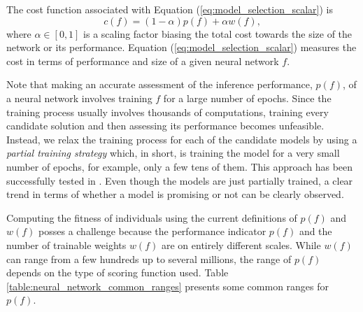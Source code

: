 \documentclass[12pt]{elsart}%
\begin{document}
The cost function associated with Equation (\ref{eq:model_selection_scalar}) is
\begin{equation}
c(f) = (1-\alpha)p(f) + \alpha w(f), 
\label{eq:fitness_function_scalar}
\end{equation}
where $\alpha \in \left[0,1\right]$ is a scaling factor biasing the total cost towards the size of the network or its performance. Equation (\ref{eq:model_selection_scalar}) measures the cost in terms of performance and size of a given neural network $f$.

Note that making an accurate assessment of the inference performance, $p(f)$, of a neural network involves training $f$ for a large number of epochs. Since the training process usually involves thousands of computations, training every candidate solution and then assessing its performance becomes unfeasible. Instead, we relax the training process for each of the candidate models by using a \textit{partial training strategy} which, in short, is training the model for a very small number of epochs, for example, only a few tens of them. This approach has been successfully tested in \cite{Laredo2018}. Even though the models are just partially trained, a clear trend in terms of whether a model is promising or not can be clearly observed.

Computing the fitness of individuals using the current definitions of $p(f)$ and $w(f)$ posses a challenge because the performance indicator $p(f)$ and the number of trainable weights $w(f)$ are on entirely different scales. While $w(f)$ can range from a few hundreds up to several millions, the range of $p(f)$ depends on the type of scoring function used. Table \ref{table:neural_network_common_ranges} presents some common ranges for $p(f)$. 

\begin{table}[!htb]
\begin{center}
\caption{Common ranges for some neural network performance indicators.}
\label{table:neural_network_common_ranges}
\vspace{12pt}
\end{center}

\end{table}
\end{document}
